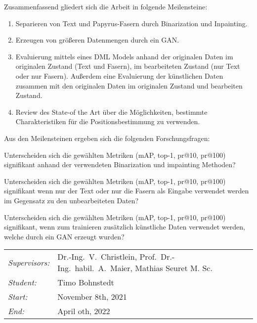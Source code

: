\documentclass[12pt,a4paper]{article}
\begin{document}
Zusammenfassend gliedert sich die Arbeit in folgende Meilensteine:


\begin{enumerate}
	\item Separieren von Text und Papyrus-Fasern durch Binarization und Inpainting.
	
	\item Erzeugen von größeren Datenmengen durch ein GAN.
	
	\item Evaluierung mittels eines DML Models anhand der originalen Daten im originalen Zustand (Text und Fasern), im bearbeiteten Zustand (nur Text oder nur Fasern). Außerdem eine Evaluierung der künstlichen Daten zusammen mit den originalen Daten im originalen Zustand und bearbeiten Zustand.
	
	\item Review des State-of the Art über die Möglichkeiten, bestimmte Charakteristiken für die Positionsbestimmung zu verwenden. 
	    	      	      	      	      	      	      
\end{enumerate}
		
Aus den Meilensteinen ergeben sich die folgenden Forschungsfragen:

\begin{questions}
	\item Unterscheiden sich die gewählten Metriken (mAP, top-1, pr@10, pr@100) signifikant anhand der verwendeten Binarization und impainting Methoden?
	
	\item  Unterscheiden sich die gewählten Metriken (mAP, top-1, pr@10, pr@100) signifikant wenn nur der Text oder nur die Fasern als Eingabe verwendet werden im Gegensatz zu den unbearbeiteten Daten?  
	\item  Unterscheiden sich die gewählten Metriken (mAP, top-1, pr@10, pr@100) signifikant, wenn zum trainieren zusätzlich künstliche Daten verwendet werden, welche durch ein GAN erzeugt wurden?
\end{questions}

		

		
\begin{tabular}{ll}
	\emph{Supervisors:} & Dr.-Ing.~V.~Christlein,  Prof.~Dr.-Ing.~habil.~A.~Maier, Mathias Seuret M. Sc.
	\\
	\emph{Student:}     & Timo Bohnstedt
	\\
	\emph{Start:}       & November 8th, 2021                                            \\
	\emph{End:}         & April oth, 2022                                        \\
\end{tabular}
\nopagebreak[4]
\small

		
\end{document}
